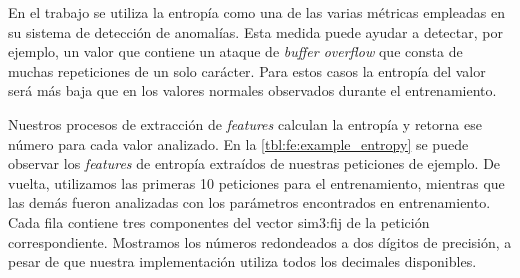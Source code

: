 En el trabajo \citep{nguyen2011application} %
se utiliza la entropía como una de las varias métricas empleadas en su
sistema de detección de anomalías.
Esta medida puede ayudar a detectar, por ejemplo, un valor que contiene
un ataque de \textit{buffer overflow} que consta de muchas repeticiones
de un solo carácter. Para estos casos la entropía del valor será más baja
que en los valores normales observados durante el entrenamiento.

Nuestros procesos de extracción de \textit{features} calculan la entropía
y retorna ese número para cada valor analizado.
En la \autoref{tbl:fe:example_entropy} se puede observar los \textit{features}
de entropía extraídos de nuestras peticiones de ejemplo. De vuelta,
utilizamos las primeras 10 peticiones para el entrenamiento, mientras
que las demás fueron analizadas con los parámetros encontrados en
entrenamiento. Cada fila contiene tres componentes del vector \gls{sim3:fij}
de la petición correspondiente.
Mostramos los números redondeados a dos dígitos de precisión, a pesar de que
nuestra implementación utiliza todos los decimales disponibles.

